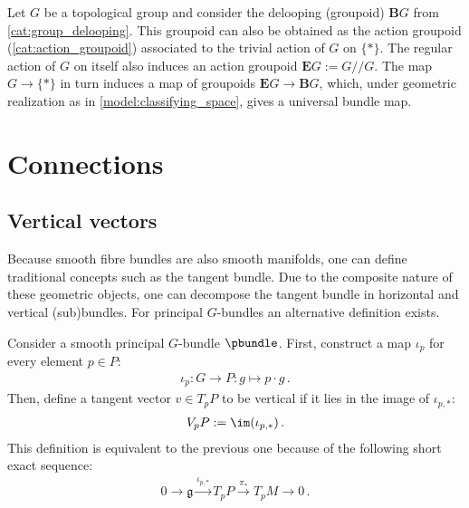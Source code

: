     \begin{construct}
        Let $G$ be a topological group and consider the delooping (groupoid) $\mathbf{B}G$ from \cref{cat:group_delooping}. This groupoid can also be obtained as the action groupoid (\cref{cat:action_groupoid}) associated to the trivial action of $G$ on $\{\ast\}$. The regular action of $G$ on itself also induces an action groupoid $\mathbf{E}G:=G/\!/G$. The map $G\rightarrow\{\ast\}$ in turn induces a map of groupoids $\mathbf{E}G\rightarrow\mathbf{B}G$, which, under geometric realization as in \cref{model:classifying_space}, gives a universal bundle map.
    \end{construct}

\section{Connections}\label{section:connections}
\subsection{Vertical vectors}

    Because smooth fibre bundles are also smooth manifolds, one can define traditional concepts such as the tangent bundle. Due to the composite nature of these geometric objects, one can decompose the tangent bundle in horizontal and vertical (sub)bundles.
    For principal $G$-bundles an alternative definition exists.
    \begin{adefinition}
        Consider a smooth principal $G$-bundle $\pbundle$. First, construct a map $\iota_p$ for every element $p\in P$:
        \begin{gather}
            \iota_p:G\rightarrow P:g\mapsto p\cdot g\,.
        \end{gather}
        Then, define a tangent vector $v\in T_pP$ to be vertical if it lies in the image of $\iota_{p,\ast}$:
        \begin{gather}
            V_pP := \im(\iota_{p,\ast})\,.
        \end{gather}
        This definition is equivalent to the previous one because of the following short exact sequence:
        \begin{gather}
            \label{bundle:principal_bundle_exact_sequence}
            0\longrightarrow\mathfrak{g}\overset{\iota_{p,\ast}}{\longrightarrow}T_pP\overset{\pi_\ast}{\longrightarrow}T_pM\longrightarrow0\,.
        \end{gather}
    \end{adefinition}

